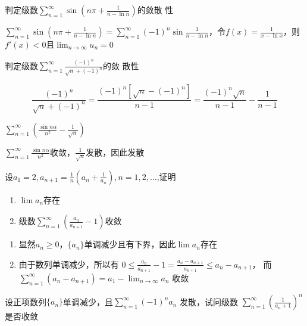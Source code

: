 \documentclass{article}
\begin{document}
\begin{examplle}[]
判定级数\(\displaystyle\sum_{n=1}^\infty\sin(n\pi+\frac{1}{n-\ln n})\)的敛散
性

\(\displaystyle\sum_{n=1}^\infty\sin(n\pi+\frac{1}{n-\ln
   n})=\sum_{n=1}^\infty(-1)^n\sin\frac{1}{n-\ln n}\)，令\(f(x)=\frac{1}{x-\ln
   x}\)，则\(f'(x)<0\)且\(\lim_{n\to\infty}u_n=0\)
\end{examplle}

\begin{examplle}[]
判定级数\(\displaystyle\sum_{n=1}^\infty\frac{(-1)^n}{\sqrt{n}+(-1)^n}\)的敛
散性

\begin{equation*}
\frac{(-1)^n}{\sqrt{n}+(-1)^n}=
\frac{(-1)^n[\sqrt{n}-(-1)^n]}{n-1}=
\frac{(-1)^n\sqrt{n}}{n-1}-\frac{1}{n-1}
\end{equation*}
\end{examplle}

\begin{examplle}[]
\(\displaystyle\sum_{n=1}^{\infty}\left(\frac{\sin
   n\alpha}{n^2}-\frac{1}{\sqrt{n}}\right)\)

\(\displaystyle\sum_{n=1}^{\infty}\frac{\sin
   n\alpha}{n^2}\)收敛，\(\displaystyle\frac{1}{\sqrt{n}}\)发散，因此发散
\end{examplle}

\begin{examplle}[]
设\(\displaystyle
   a_1=2,a_{n+1}=\frac{1}{n}\left(a_n+\frac{1}{a_n}\right),n=1,2,\dots\),证明
\begin{enumerate}
\item \(\lim a_n\)存在
\item 级数\(\displaystyle\sum_{n=1}^\infty(\frac{a_n}{a_{n+1}}-1)\)收敛
\end{enumerate}


\begin{enumerate}
\item 显然\(a_n\ge0\)，\(\{a_n\}\)单调减少且有下界，因此\(\lim a_n\)存在
\item 由于数列单调减少，所以有
\(\displaystyle
       0\le\frac{a_n}{a_{n+1}}-1=\frac{a_n-a_{n+1}}{a_{n+1}}\le a_n-a_{n+1}\)，
而\(\displaystyle\sum_{n=1}^\infty(a_n-a_{n+1})=a_1-\lim_{n\to\infty}a_n\)
收敛
\end{enumerate}
\end{examplle}

\begin{examplle}[]
设正项数列\(\{a_n\}\)单调减少，且\(\displaystyle\sum_{n=1}^\infty(-1)^na_n\)
发散，试问级数
\(\displaystyle\sum_{n=1}^\infty\left(\frac{1}{a_n+1}\right)^n\)是否收敛
\end{examplle}
\end{document}
